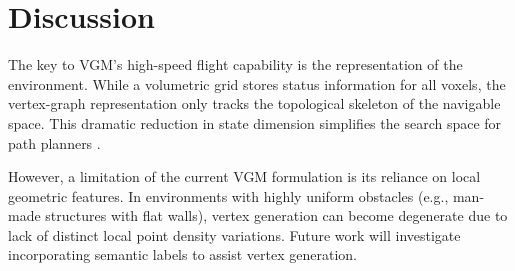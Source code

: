 \section{Discussion}
\balance
The key to VGM's high-speed flight capability is the representation of the environment. While a volumetric grid stores status information for all voxels, the vertex-graph representation only tracks the topological skeleton of the navigable space. This dramatic reduction in state dimension simplifies the search space for path planners \cite{vertex2023path}.

However, a limitation of the current VGM formulation is its reliance on local geometric features. In environments with highly uniform obstacles (e.g., man-made structures with flat walls), vertex generation can become degenerate due to lack of distinct local point density variations. Future work will investigate incorporating semantic labels to assist vertex generation.
